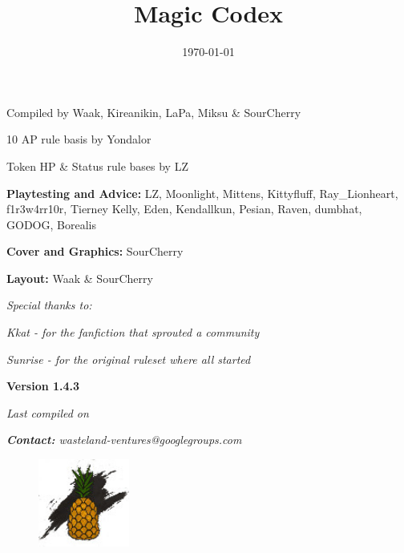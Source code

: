 \documentclass[11pt,a4paper,twocolumn]{book}
\title{Magic Codex}
\date{\today}
\begin{document}
	
			
	\onecolumn
	\setcounter{page}{1}	
	\begin{center}
		Compiled by Waak, Kireanikin, LaPa, Miksu \& SourCherry
		
		10 AP rule basis by Yondalor
		
		Token HP \& Status rule bases by LZ
		
		\bigskip		
		\textbf{Playtesting and Advice:} LZ, Moonlight, Mittens, Kittyfluff, Ray\_Lionheart, f1r3w4rr10r, Tierney Kelly, Eden, Kendallkun, Pesian, Raven, dumbhat, GODOG, Borealis
		
		\bigskip
		\textbf{Cover and Graphics:} SourCherry
		
		\bigskip
		\textbf{Layout:} Waak \& SourCherry
		
		\bigskip
		\emph{	Special thanks to:}
		
		\emph{	Kkat - for the fanfiction that sprouted a community}
			
		\emph{	Sunrise - for the original ruleset where all started}
	\end{center}
	
	\vfill
	
	\begin{center}
		\textbf{Version 1.4.3}
		
		\emph{Last compiled on \thedate}
        
        \emph{\textbf{Contact:} wasteland-ventures@googlegroups.com}
     
	\end{center}	
    \begin{figure}[bp]
		\centering
		\includegraphics[width=3cm]{ART/ISA_Logo}
	\end{figure}

	\twocolumn
	\tableofcontents

%
\end{document}
